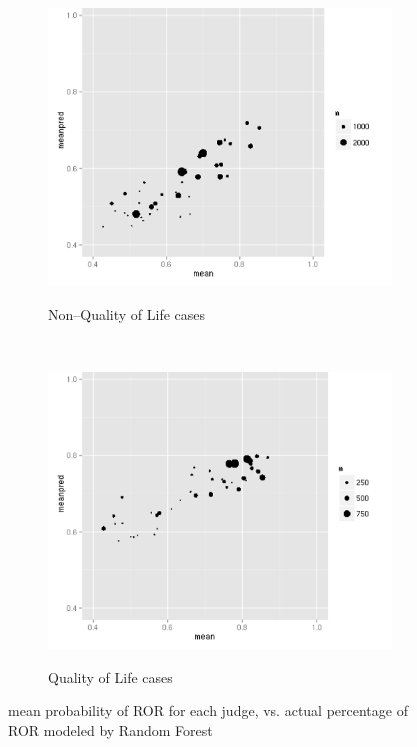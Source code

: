 \begin{figure}
  \centering
  \begin{subfigure}{0.49\textwidth}
    \caption{Non--Quality of Life cases}
    \includegraphics[width=\textwidth]{figures/figaa.png}
    \label{fig:mean_ROR_non--QoL}
  \end{subfigure}
  ~
  \begin{subfigure}{0.49\textwidth}
    \caption{Quality of Life cases}
    \includegraphics[width=\textwidth]{figures/figbb.png}
    \label{fig:mean_ROR_QoL}
  \end{subfigure}
  \caption{mean probability of ROR for each judge, vs.
  actual percentage of ROR modeled by Random Forest}


\end{figure}
